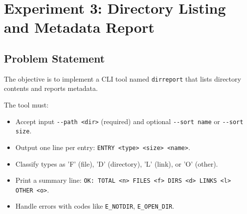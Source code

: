 
\section{Experiment 3: Directory Listing and Metadata Report}

\subsection{Problem Statement}
The objective is to implement a CLI tool named \texttt{dirreport} that lists directory contents and reports metadata.

The tool must:
\begin{itemize}
    \item Accept input \verb|--path <dir>| (required) and optional \verb|--sort name| or \verb|--sort size|.
    \item Output one line per entry: \verb|ENTRY <type> <size> <name>|.
    \item Classify types as 'F' (file), 'D' (directory), 'L' (link), or 'O' (other).
    \item Print a summary line: \verb|OK: TOTAL <n> FILES <f> DIRS <d> LINKS <l> OTHER <o>|.
    \item Handle errors with codes like \verb|E_NOTDIR|, \verb|E_OPEN_DIR|.
\end{itemize}


